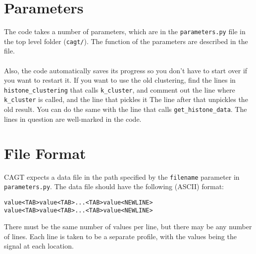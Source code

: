 \documentclass[11pt]{article}
\begin{document}
\section*{Parameters}
The code takes a number of parameters, which are in the \verb!parameters.py! file in the top level folder (\verb!cagt/!).  The function of the parameters are described in the file.
%
%
\\ \\
Also, the code automatically saves its progress so you don't have 
to start over if you want to restart it.  If you want to use the 
old clustering, find the lines in \verb!histone_clustering! that calls \verb!k_cluster!, 
and comment out the line where \verb!k_cluster! is called, and the line that pickles it 
The line after that unpickles the old result.  You can do the same with the line
that calls \verb!get_histone_data!.  The lines in question are well-marked in the code.



\section*{File Format}
CAGT expects a data file in the path specified by the \verb!filename! parameter in \verb!parameters.py!.  The data file should have the following (ASCII) format:
\begin{verbatim}
value<TAB>value<TAB>...<TAB>value<NEWLINE>
value<TAB>value<TAB>...<TAB>value<NEWLINE>
\end{verbatim}
There must be the same number of values per line, but there may be any number of lines.  Each line is taken to be a separate profile, with the values being the signal at each location.



\end{document}
